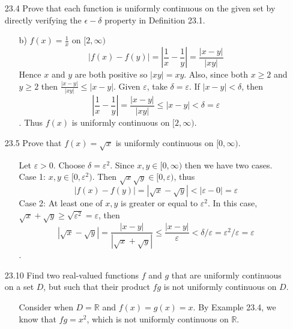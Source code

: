 \documentclass[12pt]{article}
\begin{document}
\begin{enumerate}
\item[23.4] Prove that each function is uniformly continuous on the given set by directly verifying the $\epsilon-\delta$ property in Definition 23.1.
\begin{enumerate}
\item[b)] $f(x) = \frac{1}{x}$ on $[2, \infty )$
\[
|f(x) - f(y)| = |\frac{1}{x} - \frac{1}{y}| = \frac{|x - y|}{|xy|}
\]
Hence $x$ and $y$ are both positive so $|xy| = xy$. Also, since both 
$x \geq 2$ and $y \geq 2$ then $\frac{|x - y|}{|xy|} \leq |x - y|$.
Given $\varepsilon$, take $\delta = \varepsilon$.
If $|x - y| < \delta$, then \[
|\frac{1}{x} - \frac{1}{y}| = \frac{|x - y|}{|xy|} \leq |x - y| < \delta =
\varepsilon
\]. Thus $f(x)$ is uniformly continuous on $[2, \infty)$.
\end{enumerate}

\item[23.5] Prove that $f(x) = \sqrt{x}$ is uniformly continuous on $[0, \infty )$.
\begin{enumerate}
\item[] Let $\varepsilon > 0$. Choose $\delta = \varepsilon^2$. Since
$x, y \in [0, \infty)$ then we have two cases. \\
Case 1: $x, y \in [0, \varepsilon^2)$. Then $\sqrt{x}\sqrt{y} \in [0, \varepsilon)$,
thus \[ |f(x) - f(y)| = |\sqrt{x} - \sqrt{y}| < |\varepsilon - 0| = \varepsilon \]
Case 2: At least one of $x, y$ is greater or equal to $\varepsilon^2$. In this
case, $\sqrt{x} + \sqrt{y} \geq \sqrt{\varepsilon^2} = \varepsilon$, then
\[
|\sqrt{x} - \sqrt{y}| = \frac{|x - y|}{|\sqrt{x} + \sqrt{y}|} \leq 
\frac{|x - y|}{\varepsilon} < \delta/\varepsilon = \varepsilon^2/\varepsilon 
= \varepsilon 
\].
\end{enumerate}

\item[23.10] Find two real-valued functions $f$ and $g$ that are uniformly continuous on a set $D$, but such that their product $fg$ is not uniformly continuous on $D$.
\begin{enumerate}
\item[] Consider when $D = \mathbb{R}$ and $f(x) = g(x) = x$. By Example 23.4, we
know that $fg = x^2$, which is not uniformly continuous on $\mathbb{R}$.
\end{enumerate}


\end{enumerate}
\end{document}
